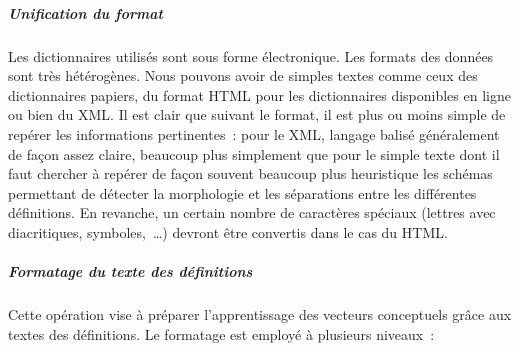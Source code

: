 \subparagraph{Unification du format}

Les dictionnaires utilisés sont sous forme électronique. Les formats
des données sont très hétérogènes. Nous pouvons avoir de simples
textes comme ceux des dictionnaires papiers, du format HTML pour les
dictionnaires disponibles en ligne ou bien du XML. Il est clair que
suivant le format, il est plus ou moins simple de repérer les
informations pertinentes~: pour le XML, langage balisé généralement de
façon assez claire, beaucoup plus simplement que pour le simple texte
dont il faut chercher à repérer de façon souvent beaucoup plus
heuristique les schémas permettant de détecter la morphologie et les
séparations entre les différentes définitions. En revanche, un certain
nombre de caractères spéciaux (lettres avec diacritiques,
symboles,~\ldots) devront être convertis dans le cas du HTML.

\subparagraph{Formatage du texte des définitions}
\label{sec:formatage-defs}

Cette opération vise à préparer l'apprentissage des vecteurs
conceptuels grâce aux textes des
définitions. Le formatage est employé à plusieurs niveaux~:

